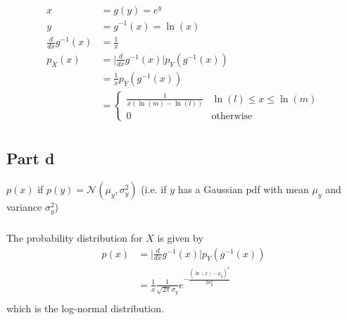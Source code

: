 \documentclass[11pt]{article}
\begin{document}
\subparagraph*{}

\begin{align*}
	x &= g(y) = e^y \\
	y &= g^{-1}(x) = \ln(x) \\
	\frac{d}{dx}g^{-1}(x) &= \frac{1}{x} \\
	p_X(x) &= \Big|\frac{d}{dx}g^{-1}(x)\Big|p_Y(g^{-1}(x)) \\
	&= \frac{1}{x}p_Y(g^{-1}(x)) \\
	&= \begin{cases} \frac{1}{x(\ln(m)-\ln(l))} & \ln(l) \leq x \leq \ln(m) \\ 0 & \text{otherwise} \end{cases} \\
\end{align*}

\subsection*{Part d}
$p(x)$ if $p(y) = \mathcal{N}(\mu_y,\sigma_y^2)$ (i.e. if $y$ has a Gaussian pdf with mean $\mu_y$ and variance $\sigma_y^2$)

\subparagraph*{}
The probability distribution for $X$ is given by
\begin{align*}
	p(x) &= \Big|\frac{d}{dx}g^{-1}(x)\Big|p_Y(g^{-1}(x)) \\
	&= \frac{1}{x} \frac{1}{\sqrt{2\pi}\sigma_y}e^{-\frac{(\ln(x)-\mu_y)^2}{2\sigma_y^2}} \\
\end{align*}
which is the log-normal distribution.
\end{document}
